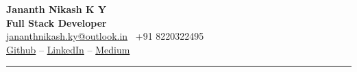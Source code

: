 \documentclass[letterpaper,10pt]{article}
\begin{document}
\begin{center}
    {\huge \textbf{Jananth Nikash K Y}} \\
    \vspace{3pt}
    {\textbf{Full Stack Developer}\\
    \href{mailto:jananthnikash.ky@outlook.in}{jananthnikash.ky@outlook.in} \ +91 8220322495} \\
    \vspace{3pt}
    \href{https://github.com/jananth-nikash-k-y}{Github} --
    \href{https://linkedin.com/in/Jananth-Nikash-K-Y}{LinkedIn} --
    \href{https://medium.com/@jananthnikash.ky}{Medium}
\end{center}
\vspace{8pt}
\hrule
\vspace{8pt}

\end{document}
